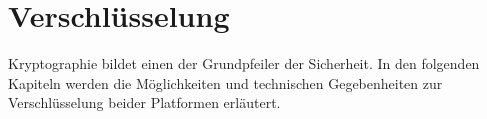 \section{Verschlüsselung}
	Kryptographie bildet einen der Grundpfeiler der Sicherheit. In den folgenden
	Kapiteln werden die Möglichkeiten und technischen Gegebenheiten zur
	Verschlüsselung beider Platformen erläutert.